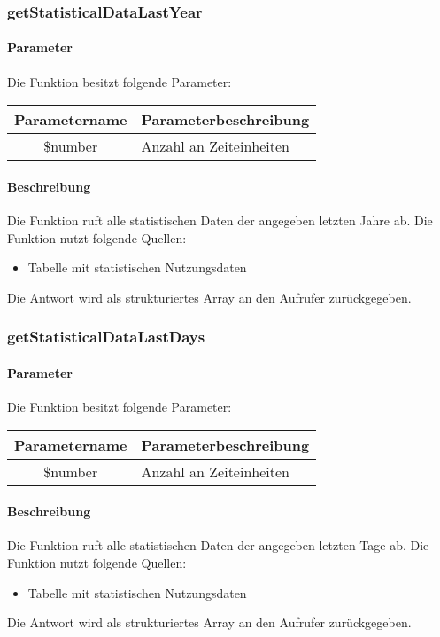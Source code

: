 \subsubsection{getStatisticalDataLastYear}
\paragraph{Parameter} Die Funktion besitzt folgende Parameter:
\begin{table}[H]
	\begin{tabular}{|c|p{11cm}|}
		\hline
		\textbf{Parametername} & \textbf{Parameterbeschreibung} \\ \hline
		\$number & Anzahl an Zeiteinheiten \\ \hline
	\end{tabular}
\end{table}
\paragraph{Beschreibung} Die Funktion ruft alle statistischen Daten der angegeben letzten Jahre ab. Die Funktion nutzt folgende Quellen:
\begin{itemize}
	\item Tabelle mit statistischen Nutzungsdaten
\end{itemize}
Die Antwort wird als strukturiertes Array an den Aufrufer zurückgegeben.
\subsubsection{getStatisticalDataLastDays}
\paragraph{Parameter} Die Funktion besitzt folgende Parameter:
\begin{table}[H]
	\begin{tabular}{|c|p{11cm}|}
		\hline
		\textbf{Parametername} & \textbf{Parameterbeschreibung} \\ \hline
		\$number & Anzahl an Zeiteinheiten \\ \hline
	\end{tabular}
\end{table}
\paragraph{Beschreibung} Die Funktion ruft alle statistischen Daten der angegeben letzten Tage ab. Die Funktion nutzt folgende Quellen:
\begin{itemize}
	\item Tabelle mit statistischen Nutzungsdaten
\end{itemize}
Die Antwort wird als strukturiertes Array an den Aufrufer zurückgegeben.